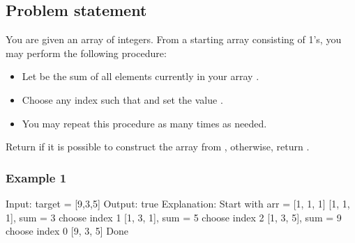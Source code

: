 \documentclass[letterpaper,12pt,english]{book}
\begin{document}
\subsection{Problem statement\sphinxfootnotemark[58]}
\label{\detokenize{Priority_Queue/1354_Construct_Target_Array_With_Multiple_Sums:problem-statement}}%
\begin{footnotetext}[58]\sphinxAtStartFootnote
{}
%
\end{footnotetext}\ignorespaces 
\sphinxAtStartPar
You are given an array  of  integers. From a starting array  consisting of  1’s, you may perform the following procedure:
\begin{itemize}
\item {} 
\sphinxAtStartPar
Let  be the sum of all elements currently in your array .

\item {} 
\sphinxAtStartPar
Choose any index  such that  and set the value .

\item {} 
\sphinxAtStartPar
You may repeat this procedure as many times as needed.

\end{itemize}

\sphinxAtStartPar
Return  if it is possible to construct the  array from , otherwise, return .


\subsubsection{Example 1}
\label{\detokenize{Priority_Queue/1354_Construct_Target_Array_With_Multiple_Sums:example-1}}
\begin{sphinxVerbatim}[commandchars=\\\{\}]
Input: target = [9,3,5]
Output: true
Explanation: Start with arr = [1, 1, 1] 
[1, 1, 1], sum = 3 choose index 1
[1, 3, 1], sum = 5 choose index 2
[1, 3, 5], sum = 9 choose index 0
[9, 3, 5] Done
\end{sphinxVerbatim}
\end{document}
